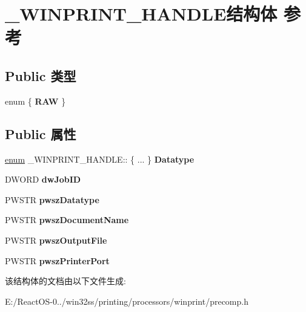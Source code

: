 \hypertarget{struct___w_i_n_p_r_i_n_t___h_a_n_d_l_e}{}\section{\+\_\+\+W\+I\+N\+P\+R\+I\+N\+T\+\_\+\+H\+A\+N\+D\+L\+E结构体 参考}
\label{struct___w_i_n_p_r_i_n_t___h_a_n_d_l_e}
\subsection*{Public 类型}
\begin{DoxyCompactItemize}
\item 
\mbox{\label{struct___w_i_n_p_r_i_n_t___h_a_n_d_l_e_a14606a52a03a2e87341b71eda0273c40}} 
enum \{ {\bfseries R\+AW}
 \}
\end{DoxyCompactItemize}
\subsection*{Public 属性}
\begin{DoxyCompactItemize}
\item 
\mbox{\label{struct___w_i_n_p_r_i_n_t___h_a_n_d_l_e_a65c835a0a0348bf77534915b19a74737}} 
\hyperlink{interfaceenum}{enum} \+\_\+\+W\+I\+N\+P\+R\+I\+N\+T\+\_\+\+H\+A\+N\+D\+L\+E\+:: \{ ... \}  {\bfseries Datatype}
\item 
\mbox{\label{struct___w_i_n_p_r_i_n_t___h_a_n_d_l_e_ac847dc865a7f50adf3e872b40b2a5e87}} 
D\+W\+O\+RD {\bfseries dw\+Job\+ID}
\item 
\mbox{\label{struct___w_i_n_p_r_i_n_t___h_a_n_d_l_e_abfd8a83395fcdd665ad0a0fc3bb46200}} 
P\+W\+S\+TR {\bfseries pwsz\+Datatype}
\item 
\mbox{\label{struct___w_i_n_p_r_i_n_t___h_a_n_d_l_e_ab622afd60d4e184bfd7e7c2ae83283d3}} 
P\+W\+S\+TR {\bfseries pwsz\+Document\+Name}
\item 
\mbox{\label{struct___w_i_n_p_r_i_n_t___h_a_n_d_l_e_a6eaa05e64d75ca643cc963a5829261d3}} 
P\+W\+S\+TR {\bfseries pwsz\+Output\+File}
\item 
\mbox{\label{struct___w_i_n_p_r_i_n_t___h_a_n_d_l_e_a710bcb92f2158738ecdf9184930bb9df}} 
P\+W\+S\+TR {\bfseries pwsz\+Printer\+Port}
\end{DoxyCompactItemize}


该结构体的文档由以下文件生成\+:\begin{DoxyCompactItemize}
\item 
E\+:/\+React\+O\+S-\/0../win32ss/printing/processors/winprint/precomp.\+h\end{DoxyCompactItemize}
